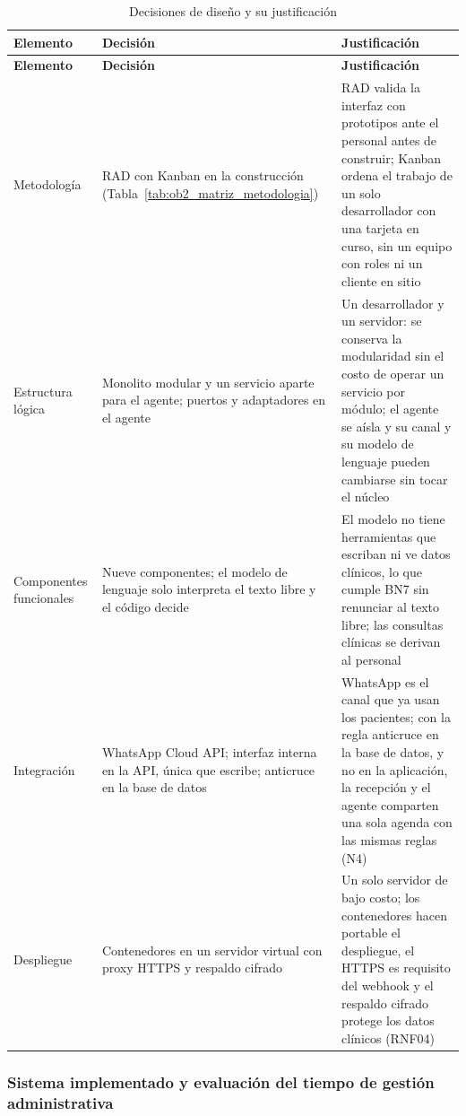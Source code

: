 \begingroup
\fontsize{9}{11}\selectfont
\renewcommand{\arraystretch}{1.2}
\setlength{\LTpre}{0pt}\setlength{\LTpost}{6pt}
\setlength{\tabcolsep}{4pt}
\begin{xltabular}{\linewidth}{|>{\raggedright\arraybackslash}p{2.4cm}|>{\raggedright\arraybackslash}X|>{\raggedright\arraybackslash}X|}
\caption{Decisiones de diseño y su justificación}
\label{tab:res_diseno} \\
\hline
\textbf{Elemento} & \textbf{Decisión} & \textbf{Justificación} \\ \hline
\endfirsthead
\hline
\textbf{Elemento} & \textbf{Decisión} & \textbf{Justificación} \\ \hline
\endhead
Metodología & RAD con Kanban en la construcción (Tabla~\ref{tab:ob2_matriz_metodologia}) & RAD valida la interfaz con prototipos ante el personal antes de construir; Kanban ordena el trabajo de un solo desarrollador con una tarjeta en curso, sin un equipo con roles ni un cliente en sitio \\ \hline
Estructura lógica & Monolito modular y un servicio aparte para el agente; puertos y adaptadores en el agente & Un desarrollador y un servidor: se conserva la modularidad sin el costo de operar un servicio por módulo; el agente se aísla y su canal y su modelo de lenguaje pueden cambiarse sin tocar el núcleo \\ \hline
Componentes funcionales & Nueve componentes; el modelo de lenguaje solo interpreta el texto libre y el código decide & El modelo no tiene herramientas que escriban ni ve datos clínicos, lo que cumple BN7 sin renunciar al texto libre; las consultas clínicas se derivan al personal \\ \hline
Integración & WhatsApp Cloud API; interfaz interna en la API, única que escribe; anticruce en la base de datos & WhatsApp es el canal que ya usan los pacientes; con la regla anticruce en la base de datos, y no en la aplicación, la recepción y el agente comparten una sola agenda con las mismas reglas (N4) \\ \hline
Despliegue & Contenedores en un servidor virtual con proxy HTTPS y respaldo cifrado & Un solo servidor de bajo costo; los contenedores hacen portable el despliegue, el HTTPS es requisito del webhook y el respaldo cifrado protege los datos clínicos (RNF04) \\ \hline
\end{xltabular}
\endgroup

\subsubsection{Sistema implementado y evaluación del tiempo de gestión administrativa}

